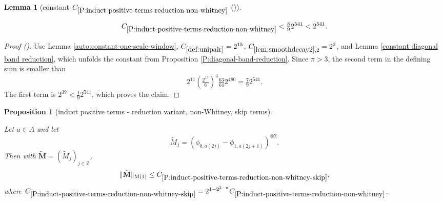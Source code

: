 \documentclass[12pt,reqno]{amsart}
\newcommand{\auto}{{({\tiny\faCar})}}
\theoremstyle{plain}
\newtheorem{lemma}[theorem]{Lemma}
\newtheorem{proposition}[theorem]{Proposition}
\numberwithin{equation}{section}
\theoremstyle{remark}
\newcommand{\uses}[1]{}
\newcommand{\usesdefs}[1]{}
\newcommand{\leanok}{}
\newcommand{\lean}[1]{}
\newcommand{\Z}{{\mathbb Z}}
\newcommand{\M}{\mathbf{M}}
\begin{document}
\begin{lemma}[constant $C_{\ref{P:induct-positive-terms-reduction-non-whitney}}$ \auto]\label{constant non Whitney reduction}\uses{auto:constant-one-scale-window,lem:smoothdecay2,P:diagonal-band-reduction,constant diagonal band reduction,P:induct-positive-terms-reduction-non-whitney}\usesdefs{def:unipair}
\lean{Auto.constantNonWhitneyReduction}
\leanok
\begin{equation}\label{constant non Whitney reduction bound}
C_{\ref{P:induct-positive-terms-reduction-non-whitney}}
<\tfrac89 2^{541}<2^{541}.
\end{equation}
\end{lemma}
\begin{proof}[Proof \auto]
Use Lemma \ref{auto:constant-one-scale-window}, $C_{\ref{def:unipair}}=2^{15}$, $C_{\ref{lem:smoothdecay2},2}=2^2$, and Lemma \ref{constant diagonal band reduction}, which unfolds the constant from Proposition \ref{P:diagonal-band-reduction}. Since $\pi>3$, the second term in the defining sum is smaller than
\[
2^{11}\left(\tfrac{2^{15}}6\right)^4\tfrac{63}{64}2^{480}
=\tfrac79 2^{541}.
\]
The first term is $2^{39}<\frac19 2^{541}$, which proves the claim.
\end{proof}


\begin{proposition}[induct positive terms - reduction variant, non-Whitney, skip terms]
\label{P:induct-positive-terms-reduction-non-whitney-skip}\uses{positive terms,P:induct-positive-terms-reduction-non-whitney}\usesdefs{normalized function tuples,auto:prism-form-definition,multiplicatively spaced monotone sequences,geometric parameters,double sequence of 2D functions,kernel sequences,def:unipair}
\lean{Auto.inductPositiveTermsReductionNonWhitneySkip}
\leanok
Let $a\in A$ and let
\begin{equation}\label{auto:skipped-non-Whitney-kernel}\tilde{M}_j=({\phi}_{0,a(2j)}-{\phi}_{1,a(2j+1)})^{\otimes 2}.\end{equation}
Then with $\tilde{\M}=(\tilde{M}_j)_{j\in \Z}$,
\begin{equation}\label{E:est-skipped-terms}
\|\tilde{\M}\|_{\rm M(1)}\le C_{\ref{P:induct-positive-terms-reduction-non-whitney-skip}},
\end{equation}
where $C_{\ref{P:induct-positive-terms-reduction-non-whitney-skip}}= 2^{1-2^{2-n}} C_{\ref{P:induct-positive-terms-reduction-non-whitney}}$.
\end{proposition}
\end{document}

